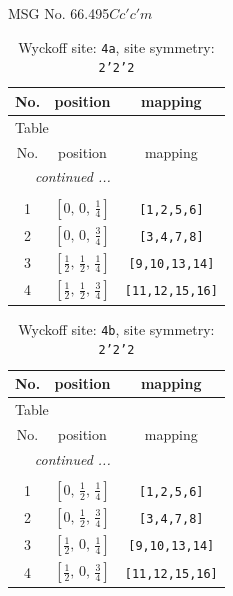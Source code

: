 \documentclass[fleqn,8pt]{jsarticle}
\begin{document}
\setcounter{MaxMatrixCols}{32}

\renewcommand{\tablename}{Table~}
\renewcommand{\figurename}{Figure~}
\begin{center}
\LARGE
MSG No. 66.495\quad$Cc'c'm$
\end{center}
\renewcommand{\arraystretch}{1.2}
\begin{longtable}{ccc}
\caption{Wyckoff site: {\tt 4a}, site symmetry: {\tt 2'2'2}}
 \\
 \hline \hline
No. & position & mapping \\ \hline \endfirsthead

\multicolumn{2}{l}{\tablename\ \thetable{}} \\
 \hline \hline
No. & position & mapping \\ \hline \endhead

 \hline \hline
\multicolumn{2}{r}{\footnotesize\it continued ...} \\ \endfoot

 \hline \hline
\multicolumn{2}{r}{} \\ \endlastfoot

1 & $\left[ 0,\, 0,\, \frac{1}{4} \right]$ & {\tt [1,2,5,6]} \\ \hline
2 & $\left[ 0,\, 0,\, \frac{3}{4} \right]$ & {\tt [3,4,7,8]} \\ \hline
3 & $\left[ \frac{1}{2},\, \frac{1}{2},\, \frac{1}{4} \right]$ & {\tt [9,10,13,14]} \\ \hline
4 & $\left[ \frac{1}{2},\, \frac{1}{2},\, \frac{3}{4} \right]$ & {\tt [11,12,15,16]} \\
\end{longtable}
\renewcommand{\arraystretch}{1.2}
\begin{longtable}{ccc}
\caption{Wyckoff site: {\tt 4b}, site symmetry: {\tt 2'2'2}}
 \\
 \hline \hline
No. & position & mapping \\ \hline \endfirsthead

\multicolumn{2}{l}{\tablename\ \thetable{}} \\
 \hline \hline
No. & position & mapping \\ \hline \endhead

 \hline \hline
\multicolumn{2}{r}{\footnotesize\it continued ...} \\ \endfoot

 \hline \hline
\multicolumn{2}{r}{} \\ \endlastfoot

1 & $\left[ 0,\, \frac{1}{2},\, \frac{1}{4} \right]$ & {\tt [1,2,5,6]} \\ \hline
2 & $\left[ 0,\, \frac{1}{2},\, \frac{3}{4} \right]$ & {\tt [3,4,7,8]} \\ \hline
3 & $\left[ \frac{1}{2},\, 0,\, \frac{1}{4} \right]$ & {\tt [9,10,13,14]} \\ \hline
4 & $\left[ \frac{1}{2},\, 0,\, \frac{3}{4} \right]$ & {\tt [11,12,15,16]} \\
\end{longtable}
\end{document}
